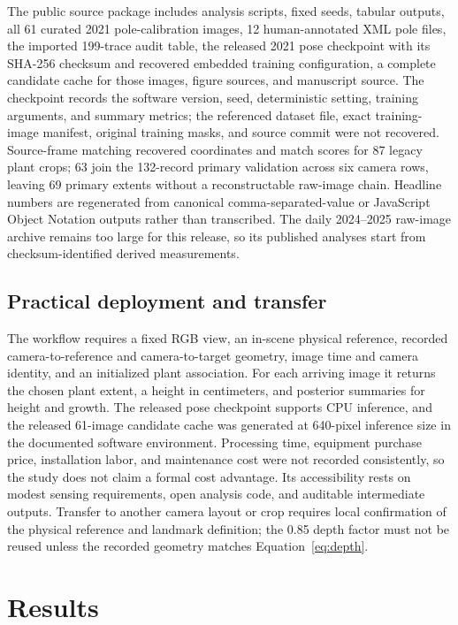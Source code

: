 \documentclass[12pt,letterpaper]{article}
\begin{document}
The public source package includes analysis scripts, fixed seeds, tabular outputs, all 61 curated 2021 pole-calibration images, 12 human-annotated XML pole files, the imported 199-trace audit table, the released 2021 pose checkpoint with its SHA-256 checksum and recovered embedded training configuration, a complete candidate cache for those images, figure sources, and manuscript source. The checkpoint records the software version, seed, deterministic setting, training arguments, and summary metrics; the referenced dataset file, exact training-image manifest, original training masks, and source commit were not recovered. Source-frame matching recovered coordinates and match scores for 87 legacy plant crops; 63 join the 132-record primary validation across six camera rows, leaving 69 primary extents without a reconstructable raw-image chain. Headline numbers are regenerated from canonical comma-separated-value or JavaScript Object Notation outputs rather than transcribed. The daily 2024--2025 raw-image archive remains too large for this release, so its published analyses start from checksum-identified derived measurements.

\subsection{Practical deployment and transfer}

The workflow requires a fixed RGB view, an in-scene physical reference, recorded camera-to-reference and camera-to-target geometry, image time and camera identity, and an initialized plant association. For each arriving image it returns the chosen plant extent, a height in centimeters, and posterior summaries for height and growth. The released pose checkpoint supports CPU inference, and the released 61-image candidate cache was generated at 640-pixel inference size in the documented software environment. Processing time, equipment purchase price, installation labor, and maintenance cost were not recorded consistently, so the study does not claim a formal cost advantage. Its accessibility rests on modest sensing requirements, open analysis code, and auditable intermediate outputs. Transfer to another camera layout or crop requires local confirmation of the physical reference and landmark definition; the 0.85 depth factor must not be reused unless the recorded geometry matches Equation~\ref{eq:depth}.

\section{Results}
\end{document}
